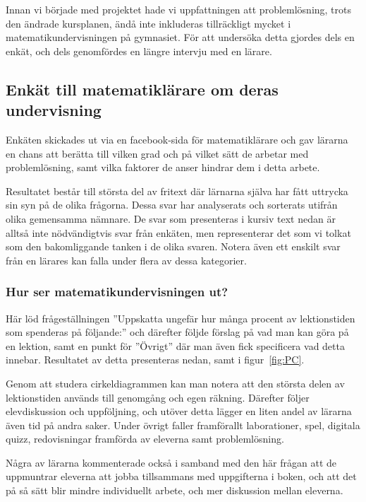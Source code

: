 \textcolor{lila}{Innan vi började med projektet hade vi uppfattningen att problemlösning, trots den ändrade kursplanen, ändå inte inkluderas tillräckligt mycket i matematikundervisningen på gymnasiet. För att undersöka detta gjordes dels en enkät, och dels genomfördes en längre intervju med en lärare.} 

\subsection{Enkät till matematiklärare om deras undervisning}
\label{sec:Bakgrunsenkat}
\textcolor{lila}{Enkäten skickades ut via en facebook-sida för matematiklärare och gav lärarna en chans att berätta till vilken grad och på vilket sätt de arbetar med problemlösning, samt vilka faktorer de anser hindrar dem i detta arbete.}

\textcolor{lila}{Resultatet består till största del av fritext där lärnarna själva har fått uttrycka sin syn på de olika frågorna. Dessa svar har analyserats och sorterats utifrån olika gemensamma nämnare. De svar som presenteras i kursiv text nedan är alltså inte nödvändigtvis svar från enkäten, men representerar det som vi tolkat som den bakomliggande tanken i de olika svaren. Notera även ett enskilt svar från en lärares kan falla under flera av dessa kategorier.}

\subsubsection{Hur ser matematikundervisningen ut?}

\textcolor{lila}{Här löd frågeställningen ''Uppskatta ungefär hur många procent av lektionstiden som spenderas på följande:'' och därefter följde förslag på vad man kan göra på en lektion, samt en punkt för ''Övrigt'' där man även fick specificera vad detta innebar. Resultatet av detta presenteras nedan, samt i figur~\ref{fig:PC}.}



\textcolor{lila}{Genom att studera cirkeldiagrammen kan man notera att den största delen av lektionstiden används till genomgång och egen räkning. Därefter följer elevdiskussion och uppföljning, och utöver detta lägger en liten andel av lärarna även tid på andra saker. Under övrigt faller framförallt laborationer, spel, digitala quizz, redovisningar framförda av eleverna samt problemlösning.}

\textcolor{lila}{Några av lärarna kommenterade också i samband med den här frågan att de uppmuntrar eleverna att jobba tillsammans med uppgifterna i boken, och att det på så sätt blir mindre individuellt arbete, och mer diskussion mellan eleverna.}

